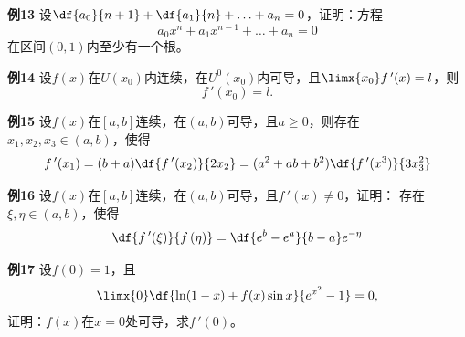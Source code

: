 \begin{frame}
	\linespread{1.2}
	\begin{exampleblock}{{\bf 例13}\hfill}
		设$\df{a_0}{n+1}+\df{a_1}{n}+\ldots+a_n=0$，证明：方程
		$$a_0x^n+a_1x^{n-1}+\ldots+a_n=0$$
		在区间$(0,1)$内至少有一个根。
	\end{exampleblock}
\end{frame}

\begin{frame}
	\linespread{1.2}
	\begin{exampleblock}{{\bf 例14}\hfill}
		设$f(x)$在$U(x_0)$内连续，在$U^0(x_0)$内可导，且$\limx{x_0}f\,'(x)=l$，则
		$$f\,'(x_0)=l.$$
	\end{exampleblock}
\end{frame}

\begin{frame}
	\linespread{1.2}
	\begin{exampleblock}{{\bf 例15}\hfill}
		设$f(x)$在$[a,b]$连续，在$(a,b)$可导，且$a\geq 0$，则存在
		$x_1,x_2,x_3\in(a,b)$，使得
		$$f\,'(x_1)=(b+a)\df{f\,'(x_2)}{2x_2}=(a^2+ab+b^2)\df{f\,'(x^3)}{3x_3^2}$$
	\end{exampleblock}
	\pause
	\begin{exampleblock}{{\bf 例16}\hfill}
		设$f(x)$在$[a,b]$连续，在$(a,b)$可导，且$f\,'(x)\ne 0$，证明：
		存在$\xi,\eta\in(a,b)$，使得
		$$\df{f\,'(\xi)}{f\,(\eta)}=\df{e^b-e^a}{b-a}e^{-\eta}$$
	\end{exampleblock}
\end{frame}


\begin{frame}
	\linespread{1.2}
	\begin{exampleblock}{{\bf 例17}}
		设$f(0)=1$，且
		$$\limx{0}\df{\ln(1-x)+f(x)\sin x}{e^{x^2}-1}=0,$$
		证明：$f(x)$在$x=0$处可导，求$f\,'(0)$。
	\end{exampleblock}
\end{frame}



